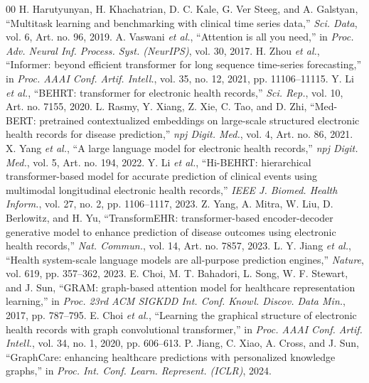 \documentclass[conference]{IEEEtran}
\begin{document}
\begin{thebibliography}{00}
 H. Harutyunyan, H. Khachatrian, D. C. Kale, G. Ver Steeg, and A. Galstyan, ``Multitask learning and benchmarking with clinical time series data,'' \textit{Sci. Data}, vol. 6, Art. no. 96, 2019.
 A. Vaswani \textit{et al.}, ``Attention is all you need,'' in \textit{Proc. Adv. Neural Inf. Process. Syst. (NeurIPS)}, vol. 30, 2017.
 H. Zhou \textit{et al.}, ``Informer: beyond efficient transformer for long sequence time-series forecasting,'' in \textit{Proc. AAAI Conf. Artif. Intell.}, vol. 35, no. 12, 2021, pp. 11106--11115.
 Y. Li \textit{et al.}, ``BEHRT: transformer for electronic health records,'' \textit{Sci. Rep.}, vol. 10, Art. no. 7155, 2020.
 L. Rasmy, Y. Xiang, Z. Xie, C. Tao, and D. Zhi, ``Med-BERT: pretrained contextualized embeddings on large-scale structured electronic health records for disease prediction,'' \textit{npj Digit. Med.}, vol. 4, Art. no. 86, 2021.
 X. Yang \textit{et al.}, ``A large language model for electronic health records,'' \textit{npj Digit. Med.}, vol. 5, Art. no. 194, 2022.
 Y. Li \textit{et al.}, ``Hi-BEHRT: hierarchical transformer-based model for accurate prediction of clinical events using multimodal longitudinal electronic health records,'' \textit{IEEE J. Biomed. Health Inform.}, vol. 27, no. 2, pp. 1106--1117, 2023.
 Z. Yang, A. Mitra, W. Liu, D. Berlowitz, and H. Yu, ``TransformEHR: transformer-based encoder-decoder generative model to enhance prediction of disease outcomes using electronic health records,'' \textit{Nat. Commun.}, vol. 14, Art. no. 7857, 2023.
 L. Y. Jiang \textit{et al.}, ``Health system-scale language models are all-purpose prediction engines,'' \textit{Nature}, vol. 619, pp. 357--362, 2023.
 E. Choi, M. T. Bahadori, L. Song, W. F. Stewart, and J. Sun, ``GRAM: graph-based attention model for healthcare representation learning,'' in \textit{Proc. 23rd ACM SIGKDD Int. Conf. Knowl. Discov. Data Min.}, 2017, pp. 787--795.
 E. Choi \textit{et al.}, ``Learning the graphical structure of electronic health records with graph convolutional transformer,'' in \textit{Proc. AAAI Conf. Artif. Intell.}, vol. 34, no. 1, 2020, pp. 606--613.
 P. Jiang, C. Xiao, A. Cross, and J. Sun, ``GraphCare: enhancing healthcare predictions with personalized knowledge graphs,'' in \textit{Proc. Int. Conf. Learn. Represent. (ICLR)}, 2024.

\end{thebibliography}
\end{document}
